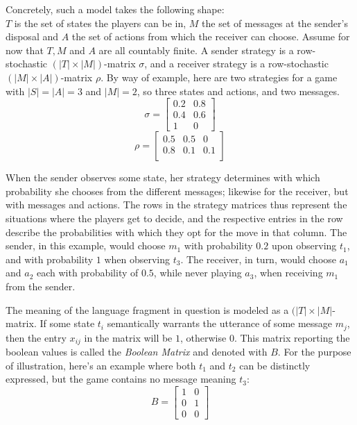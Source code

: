 \documentclass{article}
\begin{document}
Concretely, such a model takes the following shape:\\
$T$ is the set of states the players can be in, $M$ the set of messages at the sender's disposal and $A$ the set of actions from which the receiver can choose. Assume for now that $T,M$ and $A$ are all countably finite. A sender strategy is a row-stochastic $(|T| \times |M|)$-matrix $\sigma$, and a receiver strategy is a row-stochastic $(|M|\times |A|)$-matrix $\rho$. By way of example, here are two strategies for a game with $|S|=|A|=3$ and $|M|=2$, so three states and actions, and two messages. \\
\begin{equation*}
\sigma =
\begin{bmatrix}
0.2 & 0.8 \\
0.4 & 0.6 \\
1 & 0
\end{bmatrix}
\end{equation*}
\begin{equation*}
\rho =
\begin{bmatrix}
0.5 & 0.5 & 0\\
0.8 & 0.1 & 0.1 \\
\end{bmatrix}
\end{equation*}%

When the sender observes some state, her strategy determines with which probability she chooses from the different messages; likewise for the receiver, but with messages and actions. The rows in the strategy matrices thus represent the situations where the players get to decide, and the respective entries in the row describe the probabilities with which they opt for the move in that column. The sender, in this example, would choose $m_1$ with probability $0.2$ upon observing $t_1$, and with probability $1$ when observing $t_3$. The receiver, in turn, would choose $a_1$ and $a_2$ each with probability of $0.5$, while never playing $a_3$, when receiving $m_1$ from the sender.

The meaning of the language fragment in question is modeled as a $(|T| \times |M|$-matrix. If some state $t_i$ semantically warrants the utterance of some message $m_j$, then the entry $x_{ij}$ in the matrix will be $1$, otherwise $0$. This matrix reporting the boolean values is called the \textit{Boolean Matrix} and denoted with $B$. For the purpose of illustration, here's an example where both $t_1$ and $t_2$ can be distinctly expressed, but the game contains no message meaning $t_3$:\\
\begin{equation*}
B =
\begin{bmatrix}
1 & 0\\
0 & 1\\
0 & 0
\end{bmatrix}
\end{equation*}
\end{document}
